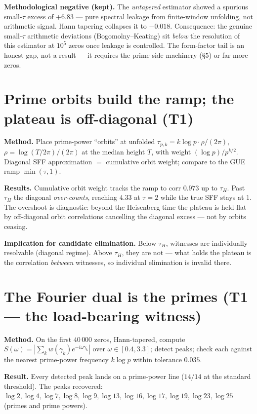 \documentclass[11pt]{article}
\begin{document}
\textbf{Methodological negative (kept).} The \emph{untapered} estimator showed a spurious small-$\tau$ excess of $+6.83$ --- pure spectral leakage from finite-window unfolding, not arithmetic signal. Hann tapering collapses it to $-0.018$. Consequence: the genuine small-$\tau$ arithmetic deviations (Bogomolny--Keating) sit \emph{below} the resolution of this estimator at $10^5$ zeros once leakage is controlled. The form-factor tail is an honest gap, not a result --- it requires the prime-side machinery (\S5) or far more zeros.

\section{Prime orbits build the ramp; the plateau is off-diagonal (T1)}

\textbf{Method.} Place prime-power ``orbits'' at unfolded $\tau_{p,k}=k\log p\cdot\rho/(2\pi)$, $\rho=\log(T/2\pi)/(2\pi)$ at the median height $T$, with weight $(\log p)/p^{k/2}$. Diagonal SFF approximation $=$ cumulative orbit weight; compare to the GUE ramp $\min(\tau,1)$.

\textbf{Results.} Cumulative orbit weight tracks the ramp to corr $\mathbf{0.973}$ up to $\tau_H$. Past $\tau_H$ the diagonal \emph{over-counts}, reaching $\mathbf{4.33}$ at $\tau=2$ while the true SFF stays at $1$. The overshoot is diagnostic: beyond the Heisenberg time the plateau is held flat by off-diagonal orbit correlations cancelling the diagonal excess --- not by orbits ceasing.

\textbf{Implication for candidate elimination.} Below $\tau_H$, witnesses are individually resolvable (diagonal regime). Above $\tau_H$, they are not --- what holds the plateau is the correlation \emph{between} witnesses, so individual elimination is invalid there.

\section{The Fourier dual is the primes (T1 --- the load-bearing witness)}

\textbf{Method.} On the first $40\,000$ zeros, Hann-tapered, compute $S(\omega)=|\sum_k w(\gamma_k)e^{-i\omega\gamma_k}|$ over $\omega\in[0.4,3.3]$; detect peaks; check each against the nearest prime-power frequency $k\log p$ within tolerance $0.035$.

\textbf{Result.} Every detected peak lands on a prime-power line ($14/14$ at the standard threshold). The peaks recovered: $\log2,\log4,\log7,\log8,\log9,\log13,\log16,\log17,\log19,\log23,\log25$ (primes and prime powers).
\end{document}
